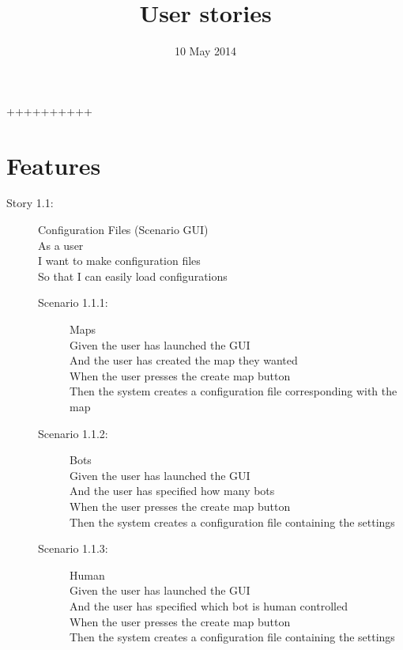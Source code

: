 ++++++++++\documentclass{article}
\title{User stories}
\date{10 May 2014}
\begin{document}
\maketitle
\section{Features}
\begin{description}
	\item[Story 1.1:] Configuration Files (Scenario GUI)\\
	As a user\\
	I want to make configuration files\\
	So that I can easily load configurations

	\begin{description}
		\item[Scenario 1.1.1:] Maps\\
		Given the user has launched the GUI\\
		And the user has created the map they wanted\\
		When the user presses the create map button\\
		Then the system creates a configuration file corresponding with the map
		
		\item[Scenario 1.1.2:] Bots\\
		Given the user has launched the GUI\\
		And the user has specified how many bots\\
		When the user presses the create map button\\
		Then the system creates a configuration file containing the settings

		\item[Scenario 1.1.3:] Human\\
		Given the user has launched the GUI\\
		And the user has specified which bot is human controlled\\
		When the user presses the create map button\\
		Then the system creates a configuration file containing the settings
	\end{description}
\end{description}
\end{document}

